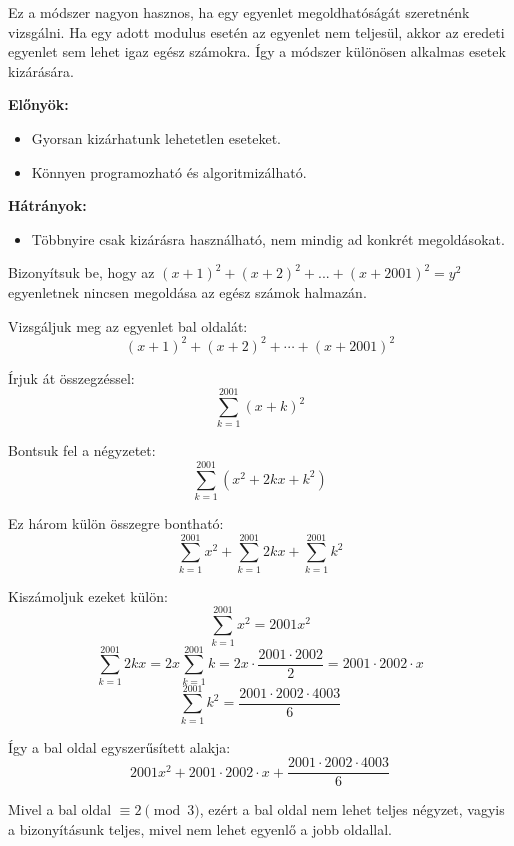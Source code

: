 Ez a módszer nagyon hasznos, ha egy egyenlet megoldhatóságát szeretnénk
vizsgálni. Ha egy adott modulus esetén az egyenlet nem teljesül, akkor
az eredeti egyenlet sem lehet igaz egész számokra. Így a módszer különösen
alkalmas esetek kizárására.

\noindent\textbf{Előnyök:} 
\begin{itemize}
	\item Gyorsan kizárhatunk lehetetlen eseteket. 
	\item Könnyen programozható és algoritmizálható. 
\end{itemize}
\textbf{Hátrányok:} 
\begin{itemize}
	\item Többnyire csak kizárásra használható, nem mindig ad konkrét megoldásokat. 
\end{itemize}

\begin{problem}
	Bizonyítsuk be, hogy az $(x+1)^{2}+(x+2)^{2}+...+(x+2001)^{2}=y^{2}$
	egyenletnek nincsen megoldása az egész számok halmazán.
\end{problem}
\begin{solution}
	Vizsgáljuk meg az egyenlet bal oldalát:
	\[
	(x+1)^{2}+(x+2)^{2}+\cdots+(x+2001)^{2}
	\]
	
	Írjuk át összegzéssel:
	\[
	\sum_{k=1}^{2001}(x+k)^{2}
	\]
	
	Bontsuk fel a négyzetet:
	\[
	\sum_{k=1}^{2001}(x^{2}+2kx+k^{2})
	\]
	
	
	Ez három külön összegre bontható:
	\[
	\sum_{k=1}^{2001}x^{2}+\sum_{k=1}^{2001}2kx+\sum_{k=1}^{2001}k^{2}
	\]
	
	Kiszámoljuk ezeket külön:
	\[
	\sum_{k=1}^{2001}x^{2}=2001x^{2}
	\]
	\[
	\sum_{k=1}^{2001}2kx=2x\sum_{k=1}^{2001}k=2x\cdot\frac{2001\cdot2002}{2}=2001\cdot2002\cdot x
	\]
	\[
	\sum_{k=1}^{2001}k^{2}=\frac{2001\cdot2002\cdot4003}{6}
	\]
	
	Így a bal oldal egyszerűsített alakja:
	\[
	2001x^{2}+2001\cdot2002\cdot x+\frac{2001\cdot2002\cdot4003}{6}
	\]
	
	Mivel a bal oldal $\equiv2\pmod 3$, ezért a bal oldal nem lehet
	teljes négyzet, vagyis a bizonyításunk teljes, mivel nem lehet egyenlő
	a jobb oldallal. 
\end{solution}

